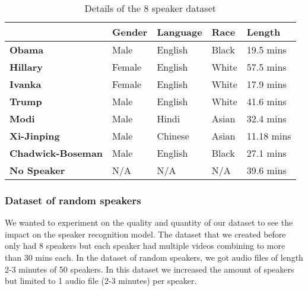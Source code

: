 \documentclass[10pt,twocolumn,letterpaper]{article}
\begin{document}
\begin{table}[h]
    \begin{tabular}{l|l|l|l|l|}
    \cline{2-5}
                                                    & \textbf{Gender} & \textbf{Language} & \textbf{Race} & \textbf{Length} \\ \hline
    \multicolumn{1}{|l|}{\textbf{Obama}}            & Male            & English           & Black         & 19.5 mins       \\ \hline
    \multicolumn{1}{|l|}{\textbf{Hillary}}          & Female          & English           & White         & 57.5 mins       \\ \hline
    \multicolumn{1}{|l|}{\textbf{Ivanka}}           & Female          & English           & White         & 17.9 mins       \\ \hline
    \multicolumn{1}{|l|}{\textbf{Trump}}            & Male            & English           & White         & 41.6 mins       \\ \hline
    \multicolumn{1}{|l|}{\textbf{Modi}}             & Male            & Hindi             & Asian         & 32.4 mins       \\ \hline
    \multicolumn{1}{|l|}{\textbf{Xi-Jinping}}       & Male            & Chinese           & Asian         & 11.18 mins      \\ \hline
    \multicolumn{1}{|l|}{\textbf{Chadwick-Boseman}} & Male            & English           & Black         & 27.1 mins       \\ \hline
    \multicolumn{1}{|l|}{\textbf{No Speaker}}       & N/A             & N/A               & N/A           & 39.6 mins       \\ \hline
    \end{tabular}
    \caption{Details of the 8 speaker dataset}
    \label{Dataset}
\end{table}

\subsubsection{Dataset of random speakers}

We wanted to experiment on the quality and quantity of our dataset to see the impact on the speaker recognition model. The dataset that we created before only had 8 speakers but each speaker had multiple videos combining to more than 30 mins each. In the dataset of random speakers, we got audio files of length 2-3 minutes of 50 speakers. In this dataset we increased the amount of speakers but limited to 1 audio file (2-3 minutes) per speaker. 
\end{document}
